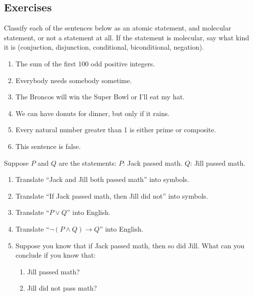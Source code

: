 \documentclass[10pt,]{book}
\theoremstyle{plain}
\theoremstyle{definition}
\theoremstyle{definition}
\theoremstyle{definition}
\theoremstyle{definition}
\numberwithin{equation}{chapter}
\def\imp{\rightarrow}
\begin{document}
\subsection*{Exercises}\label{exercises_intro-statements}
\begin{divisionexercise}{1}\hypertarget{exercise-177}{}
\hypertarget{p-1365}{}%
Classify each of the sentences below as an atomic statement, and molecular statement, or not a statement at all.  If the statement is molecular, say what kind it is (conjuction, disjunction, conditional, biconditional, negation). \leavevmode%
\begin{enumerate}[label=(\alph*)]
\item\hypertarget{li-323}{}The sum of the first 100 odd positive integers.%
\item\hypertarget{li-324}{}Everybody needs somebody sometime.%
\item\hypertarget{li-325}{}The Broncos will win the Super Bowl or I'll eat my hat.%
\item\hypertarget{li-326}{}We can have donuts for dinner, but only if it rains.%
\item\hypertarget{li-327}{}Every natural number greater than 1 is either prime or composite.%
\item\hypertarget{li-328}{}This sentence is false.%
\end{enumerate}
%
\end{divisionexercise}%
\begin{divisionexercise}{2}\hypertarget{exercise-178}{}
\hypertarget{p-1367}{}%
Suppose \(P\) and \(Q\) are the statements: \(P\): Jack passed math. \(Q\): Jill passed math.%
\leavevmode%
\begin{enumerate}[label=(\alph*)]
\item\hypertarget{li-335}{}\hypertarget{p-1368}{}%
Translate ``Jack and Jill both passed math'' into symbols.%
\item\hypertarget{li-336}{}\hypertarget{p-1369}{}%
Translate ``If Jack passed math, then Jill did not'' into symbols.%
\item\hypertarget{li-337}{}\hypertarget{p-1370}{}%
Translate ``\(P \vee Q\)'' into English.%
\item\hypertarget{li-338}{}\hypertarget{p-1371}{}%
Translate ``\(\neg(P \wedge Q) \imp Q\)'' into English.%
\item\hypertarget{li-339}{}\hypertarget{p-1372}{}%
Suppose you know that if Jack passed math, then so did Jill.  What can you conclude if you know that: %
\begin{enumerate}[label=\roman*.]
\item\hypertarget{li-340}{}Jill passed math?%
\item\hypertarget{li-341}{}Jill did not pass math?%
\end{enumerate}
%
\end{enumerate}
\end{divisionexercise}%
\end{document}
